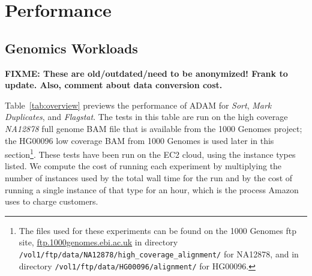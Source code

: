\documentclass{acm_proc_article-sp}
\begin{document}
\section{Performance}
\label{sec:performance}


\subsection{Genomics Workloads}
\label{sec:genomics-performance}

\textbf{FIXME: These are old/outdated/need to be anonymized! Frank to update. Also, comment about data conversion cost.}

Table~\ref{tab:overview} previews the performance of ADAM for \textit{Sort}, \textit{Mark Duplicates},
and \textit{Flagstat}. The tests in this table are run on the high coverage \textit{NA12878} full genome
BAM file that is available from the 1000 Genomes project; the HG00096 low coverage BAM from 1000
Genomes is used later in this section\footnote{The files used for these experiments can be found on the
1000 Genomes ftp site, \url{ftp.1000genomes.ebi.ac.uk} in directory
\texttt{/vol1/ftp/data/NA12878/high\_coverage\_alignment/} for NA12878, and in directory
\texttt{/vol1/ftp/data/HG00096/alignment/} for HG00096.}. These tests have been run on the EC2 cloud,
using the instance types listed. We compute the cost of running each experiment by multiplying the
number of instances used by the total wall time for the run and by the cost of running a single instance
of that type for an hour, which is the process Amazon uses to charge customers.
\end{document}
